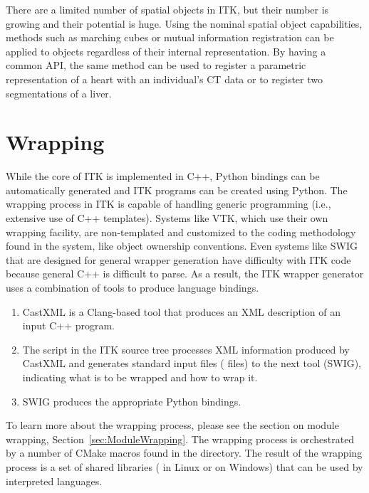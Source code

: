 There are a limited number of spatial objects in ITK, but
their number is growing and their potential is huge. Using the nominal
spatial object capabilities, methods such as marching cubes or mutual
information registration can be applied to objects regardless of their
internal representation. By having a common API, the same method can be used
to register a parametric representation of a heart with an individual's CT
data or to register two segmentations of a liver.


\section{Wrapping}%
\label{sec:Wrapping}%
%

While the core of ITK is implemented in C++, Python bindings can be
automatically generated and ITK programs can be created using Python.  The
wrapping process in ITK is capable of handling generic programming (i.e.,
extensive use of C++ templates). Systems like VTK, which use their own
wrapping facility, are non-templated and customized to the coding methodology
found in the system, like object ownership conventions. Even systems
like SWIG that are designed for general wrapper generation have difficulty
with ITK code because general C++ is difficult to parse. As a result, the ITK
wrapper generator uses a combination of tools to produce language bindings.

\begin{enumerate}
  \item CastXML is a Clang-based tool that
    produces an XML description of an input C++ program.
  \item The  script in the ITK source tree processes XML
    information produced by CastXML and generates standard input files
    ( files) to the next tool (SWIG), indicating what is to be wrapped
    and how to wrap it.
  \item SWIG produces the appropriate Python bindings.
\end{enumerate}

To learn more about the wrapping process, please see the section on module
wrapping, Section~\ref{sec:ModuleWrapping}.  The wrapping process is orchestrated by a
number of CMake macros found in the  directory. The result of
the wrapping process is a set of shared libraries ( in Linux or  on
Windows) that can be used by interpreted languages.

